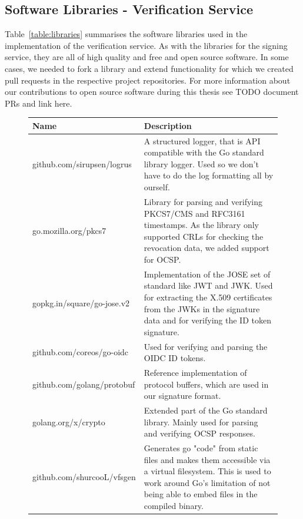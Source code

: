 \subsection{Software Libraries - Verification Service}\label{subsec:software-libraries-verifier}
Table~\ref{table:libraries} summarises the software libraries used in the implementation of the verification service.
As with the libraries for the signing service,
they are all of high quality and free and open source software.
In some cases, we needed to fork a library and extend functionality for which we created pull requests in the respective project repositories.
For more information about our contributions to open source software during this thesis see TODO document PRs and link here.

\begin{figure}
    \begin{center}
        \begin{tabular}{p{4.2cm}|p{12cm}}
            \textbf{Name} & \textbf{Description} \\ \hline
            github.com/sirupsen/logrus & A structured logger, that is API compatible with the Go standard library logger. Used so we don't have to do the log formatting all by ourself. \\
            \hline
            go.mozilla.org/pkcs7 & Library for parsing and verifying \gls{PKCS7}/\gls{CMS} and RFC3161\cite{rfc3161} timestamps. As the library only supported \gls{CRL}s for checking the revocation data, we added support for \gls{OCSP}. \\
            \hline
            gopkg.in/square/go-jose.v2 & Implementation of the \gls{JOSE} set of standard like \gls{JWT} and \gls{JWK}. Used for extracting the X.509 certificates from the \gls{JWK}s in the signature data and for verifying the ID token signature. \\
            \hline
			github.com/coreos/go-oidc & Used for verifying and parsing the \gls{OIDC} ID tokens. \\
            \hline
            github.com/golang/protobuf & Reference implementation of protocol buffers, which are used in our signature format. \\
            \hline
            golang.org/x/crypto & Extended part of the Go standard library. Mainly used for parsing and verifying \gls{OCSP} responses. \\
            \hline
            github.com/shurcooL/vfsgen & Generates go "code" from static files and makes them accessible via a virtual filesystem. This is used to work around Go's limitation of not being able to embed files in the compiled binary.
        \end{tabular}
    \end{center}
\end{figure}


